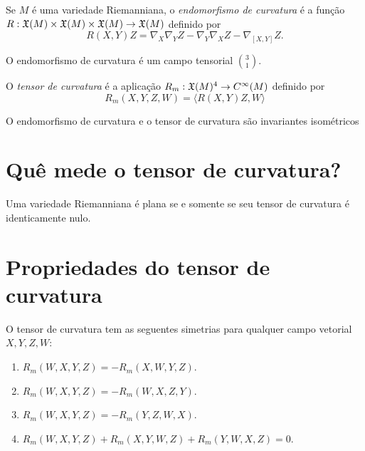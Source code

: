 \begin{definicao}
	Se $M$ é uma variedade Riemanniana, o \emph{endomorfismo de curvatura} é a função $R: \mathfrak{X}(M) \times \mathfrak{X}(M) \times \mathfrak{X}(M) \rightarrow \mathfrak{X}(M) $ definido por
	\begin{equation*}
		R(X,Y)Z = \nabla_X \nabla_Y Z - \nabla_Y \nabla_X Z - \nabla_{[X,Y]}Z.
	\end{equation*}
\end{definicao}

\begin{proposicao}
	O endomorfismo de curvatura é um campo tensorial $\binom{3}{1}$.
\end{proposicao}

\begin{definicao}
	O \emph{tensor de curvatura} é a aplicação $R_m: \mathfrak{X}(M)^4 \rightarrow C^\infty(M)$ definido por
	\begin{equation*}
		R_m (X,Y,Z,W) = \langle R(X,Y)Z,W \rangle
	\end{equation*}
\end{definicao}

\begin{lema}
	O endomorfismo de curvatura e o tensor de curvatura são invariantes isométricos
\end{lema}

\section{Quê mede o tensor de curvatura?}

\begin{teorema}
	Uma variedade Riemanniana é plana se e somente se seu tensor de curvatura é identicamente nulo.
\end{teorema}


\section{Propriedades do tensor de curvatura}

\begin{proposicao}\label{simetrias-del-tensor-de-curvatura}
	O tensor de curvatura tem as seguentes simetrias para qualquer campo vetorial $X,Y,Z,W$:
	\begin{enumerate}
		\item $R_m(W,X,Y,Z) = -R_m(X,W,Y,Z)$.
		\item $R_m(W,X,Y,Z) = -R_m(W,X,Z,Y)$.
		\item $R_m(W,X,Y,Z) = -R_m(Y,Z,W,X)$.
		\item $R_m(W,X,Y,Z) + R_m(X,Y,W,Z) + R_m(Y,W,X,Z) = 0$.
	\end{enumerate}
\end{proposicao}








